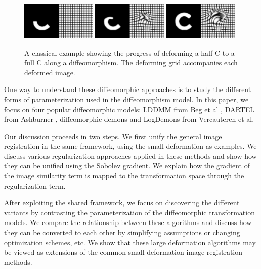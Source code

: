 \documentclass[letterpaper,12pt]{article}
\begin{document}
\begin{figure}[bhtp]
\includegraphics[width=0.32\textwidth]{fig/grid1100} 
\includegraphics[width=0.32\textwidth]{fig/grid1110} 
\includegraphics[width=0.32\textwidth]{fig/grid1119} 
\caption{A classical example showing the progress of deforming a half
  C to a full C along a diffeomorphism.  The deforming 
  grid accompanies each deformed image.}
\vspace{-0.1in}
\label{fig:chalf}
\end{figure}


One way to understand these diffeomorphic approaches is to study the different forms of parameterization used in  the diffeomorphism model. In this paper, we focus on four popular diffeomorphic models: LDDMM from Beg et al \cite{Beg2005Computing},
DARTEL from Ashburner \cite{Ashburner2007}, diffeomorphic demons \cite{Vercauteren2009} and LogDemons \cite{Vercauteren2008Symmetric} from Vercauteren et al. 

Our discussion proceeds in two steps. We first unify the general image registration in the same framework, using the small deformation as examples. We discuss various regularization approaches applied in these
methods and show how they can be unified
using the Sobolev gradient. We explain how the
gradient of the image similarity term is mapped to the transformation space through the regularization term.

After exploiting the shared framework, we focus on discovering the different variants by
contrasting the parameterization of the diffeomorphic transformation
models. We compare the relationship between these algorithms and
discuss how they can be converted to each other by simplifying
assumptions or changing optimization schemes, etc. We show that these 
large deformation algorithms may be viewed as
extensions of the common small deformation image registration methods. 
\end{document}
